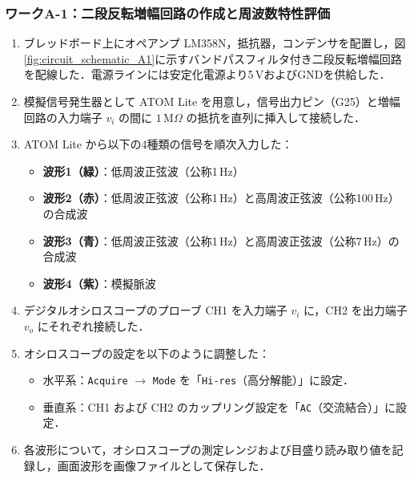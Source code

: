 \subsubsection{ワークA-1：二段反転増幅回路の作成と周波数特性評価}
\begin{enumerate}
  \item ブレッドボード上にオペアンプ LM358N，抵抗器，コンデンサを配置し，図\ref{fig:circuit_schematic_A1}に示すバンドパスフィルタ付き二段反転増幅回路を配線した．電源ラインには安定化電源より5\,VおよびGNDを供給した．
  \item 模擬信号発生器として ATOM Lite を用意し，信号出力ピン（G25）と増幅回路の入力端子 $v_i$ の間に $1\,\mathrm{M}\Omega$ の抵抗を直列に挿入して接続した．
  \item ATOM Lite から以下の4種類の信号を順次入力した：
        \begin{itemize}
          \item \textbf{波形1（緑）}：低周波正弦波（公称1\,Hz）
          \item \textbf{波形2（赤）}：低周波正弦波（公称1\,Hz）と高周波正弦波（公称100\,Hz）の合成波
          \item \textbf{波形3（青）}：低周波正弦波（公称1\,Hz）と高周波正弦波（公称7\,Hz）の合成波
          \item \textbf{波形4（紫）}：模擬脈波
        \end{itemize}
  \item デジタルオシロスコープのプローブ CH1 を入力端子 $v_i$ に，CH2 を出力端子 $v_o$ にそれぞれ接続した．
  \item オシロスコープの設定を以下のように調整した：
        \begin{itemize}
          \item 水平系：\texttt{Acquire} $\rightarrow$ \texttt{Mode} を「\texttt{Hi-res}（高分解能）」に設定．
          \item 垂直系：CH1 および CH2 のカップリング設定を「\texttt{AC}（交流結合）」に設定．
        \end{itemize}
  \item 各波形について，オシロスコープの測定レンジおよび目盛り読み取り値を記録し，画面波形を画像ファイルとして保存した．
\end{enumerate}

